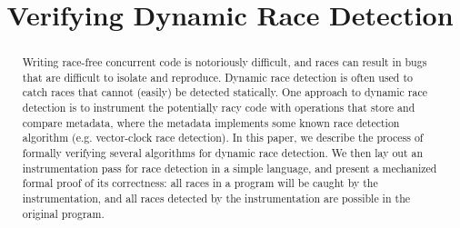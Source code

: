 \documentclass[preprint, 10pt]{sigplanconf}
\newcommand{\TODO}[1]{\textbf{\textcolor{red}{[ TODO: #1]}}}
\newcommand{\ignore}[1]{}
\newcommand{\FT}{\textsc{FastTrack}\xspace}
\begin{document}
\setlength{\pdfpageheight}{\paperheight}
\setlength{\pdfpagewidth}{\paperwidth}





\titlebanner{}        %
\preprintfooter{}   %

\title{Verifying Dynamic Race Detection}
\ignore{\authorinfo{William Mansky \and Yuanfeng Peng \and Steve Zdancewic \and Joseph Devietti}
           {University of Pennsylvania}
           {wmansky@seas.upenn.edu, yuanfeng@cis.upenn.edu, stevez@cis.upenn.edu, devietti@cis.upenn.edu}}
\authorinfo{}{}{}
\maketitle

\begin{abstract}
Writing race-free concurrent code is notoriously difficult, and races can result in bugs that are difficult to isolate and reproduce. Dynamic race detection is often used to catch races that cannot (easily) be detected statically. One approach to dynamic race detection is to instrument the potentially racy code with operations that store and compare metadata, where the metadata implements some known race detection algorithm (e.g. vector-clock race detection). In this paper, we describe the process of formally verifying several algorithms for dynamic race detection. We then lay out an instrumentation pass for race detection in a simple language, and present a mechanized formal proof of its correctness: all races in a program will be caught by the instrumentation, and all races detected by the instrumentation are possible in the original program.\ignore{ During the verification process, we discovered issues \TODO{tone this down?} in both the paper proof and the implementation of the \FT race detection algorithm.}
\end{abstract}
\end{document}
